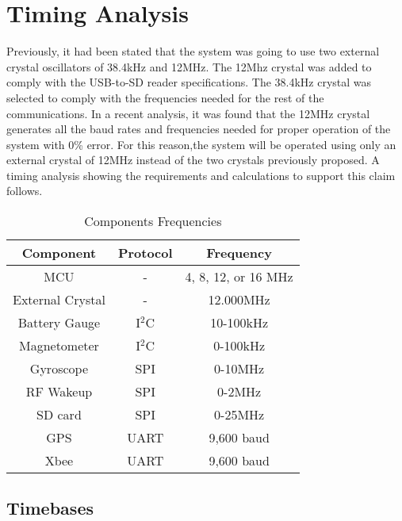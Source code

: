 \section{Timing Analysis}

Previously, it had been stated that the system was going to use two external crystal oscillators of 38.4kHz and 12MHz. The 12Mhz crystal was added to comply with the USB-to-SD reader specifications.  The 38.4kHz crystal was selected to comply with the frequencies needed for the rest of the communications. In a recent analysis, it was found that the 12MHz crystal generates all the baud rates and frequencies needed for proper operation of the system with 0\% error. For this reason,the system will be operated using only an external crystal of 12MHz instead of the two crystals previously proposed.  A timing analysis showing the requirements and calculations to support this claim follows.

\begin{table}[H]
  \centering
  \caption{Components Frequencies}
    \begin{tabular}{|c|c|c|}
    \hline
    \rowcolor{Gray}
    Component & Protocol & Frequency \\
    \hline \hline
    MCU   & -     & 4, 8, 12, or 16 MHz \\ \hline
    External Crystal & -     & 12.000MHz \\ \hline
    Battery Gauge & I$^2$C & 10-100kHz \\ \hline
    Magnetometer & I$^2$C & 0-100kHz \\ \hline
    Gyroscope & SPI   & 0-10MHz \\ \hline
    RF Wakeup & SPI   & 0-2MHz \\ \hline
    SD card & SPI   & 0-25MHz \\ \hline
    GPS   & UART  & 9,600 baud \\ \hline
    Xbee  & UART   & 9,600 baud \\ \hline
    \end{tabular}%
  \label{tab:compFreq}%
\end{table}%

\subsection{Timebases}

